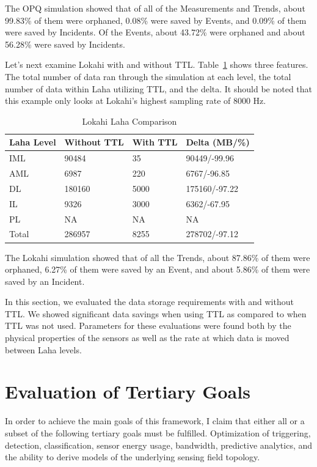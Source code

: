 The OPQ simulation showed that of all of the Measurements and Trends, about 99.83\% of them were orphaned, 0.08\% were saved by Events, and 0.09\% of them were saved by Incidents. Of the Events, about 43.72\% were orphaned and about 56.28\% were saved by Incidents.

Let's next examine Lokahi with and without TTL. Table~\ref{table:lokahi_laha_comparison} shows three features. The total number of data ran through the simulation at each level, the total number of data within Laha utilizing TTL, and the delta. It should be noted that this example only looks at Lokahi's highest sampling rate of 8000 Hz.

\begin{table}[H]
	\centering
	\caption{Lokahi Laha Comparison}
	\begin{tabularx}{\textwidth}{Xlll}
		\toprule
		\textbf{Laha Level} & \textbf{Without TTL} & \textbf{With TTL} & \textbf{Delta (MB/\%)} \\
		\midrule
		IML & 90484 & 35 & 90449/-99.96 \\
		AML & 6987 & 220 & 6767/-96.85 \\
		DL & 180160 & 5000 & 175160/-97.22 \\
		IL & 9326 & 3000 & 6362/-67.95 \\
		PL & NA & NA & NA  \\
		Total & 286957 & 8255 & 278702/-97.12 \\
		\bottomrule
	\end{tabularx}
	\label{table:lokahi_laha_comparison}
\end{table}

The Lokahi simulation showed that of all the Trends, about 87.86\% of them were orphaned, 6.27\% of them were saved by an Event, and about 5.86\% of them were saved by an Incident.

In this section, we evaluated the data storage requirements with and without TTL. We showed significant data savings when using TTL as compared to when TTL was not used. Parameters for these evaluations were found both by the physical properties of the sensors as well as the rate at which data is moved between Laha levels.

\section{Evaluation of Tertiary Goals}\label{sec:evaluation-of-tertiary-goals}
In order to achieve the main goals of this framework, I claim that either all or a subset of the following tertiary goals must be fulfilled. Optimization of triggering, detection, classification, sensor energy usage, bandwidth, predictive analytics, and the ability to derive models of the underlying sensing field topology.

